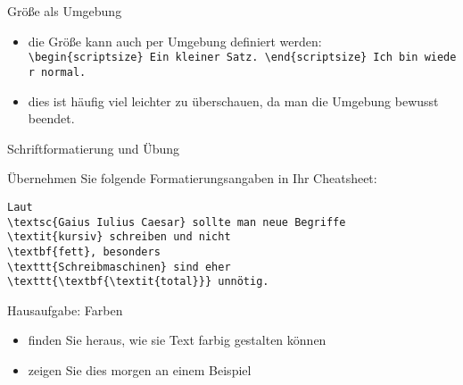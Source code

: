 \begin{frame}{Größe als Umgebung}

\begin{itemize}
\itemsep1pt\parskip0pt
\item
  die Größe kann auch per Umgebung definiert werden:
  \texttt{\textbackslash{}begin\{scriptsize\}\ Ein\ kleiner\ Satz.\ \textbackslash{}end\{scriptsize\}\ Ich\ bin\ wieder\ normal.}
\item
  dies ist häufig viel leichter zu überschauen, da man die Umgebung
  bewusst beendet.
\end{itemize}

\end{frame}

\begin{frame}[fragile]{Schriftformatierung und Übung}

Übernehmen Sie folgende Formatierungsangaben in Ihr Cheatsheet:

\begin{verbatim}
Laut
\textsc{Gaius Iulius Caesar} sollte man neue Begriffe
\textit{kursiv} schreiben und nicht
\textbf{fett}, besonders
\texttt{Schreibmaschinen} sind eher
\texttt{\textbf{\textit{total}}} unnötig.
\end{verbatim}

\end{frame}

\begin{frame}{Hausaufgabe: Farben}

\begin{itemize}
\itemsep1pt\parskip0pt
\item
  finden Sie heraus, wie sie Text farbig gestalten können
\item
  zeigen Sie dies morgen an einem Beispiel
\end{itemize}

\end{frame}
